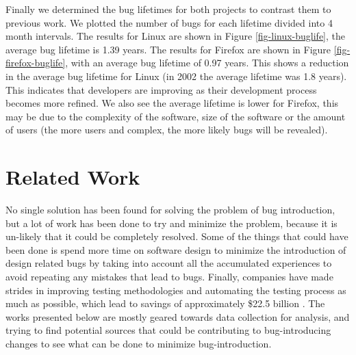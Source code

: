 \documentclass[preprint, 11pt]{sigplanconf}
\begin{document}
Finally we determined the bug lifetimes for both projects to contrast
them to previous work. We plotted the number of bugs for each lifetime
divided into 4 month intervals. The results for Linux are shown in
Figure \ref{fig-linux-buglife}, the average bug lifetime is 1.39
years. The results for Firefox are shown in Figure
\ref{fig-firefox-buglife}, with an average bug lifetime of 0.97
years. This shows a reduction in the average bug lifetime for Linux (in
2002 the average lifetime was 1.8 years). This indicates that
developers are improving as their development process becomes more
refined. We also see the average lifetime is lower for Firefox, this
may be due to the complexity of the software, size of the software or
the amount of users (the more users and complex, the more likely bugs will be
revealed).

\section{Related Work}
\label{sec-related}

No single solution has been found for solving the problem of bug
introduction, but a lot of work has been done to try and minimize the
problem, because it is un-likely that it could be completely
resolved. Some of the things that could have been done is spend more
time on software design to minimize the introduction of design related
bugs by taking into account all the accumulated experiences to avoid
repeating any mistakes that lead to bugs. Finally, companies have made
strides in improving testing methodologies and automating the testing
process as much as possible, which lead to savings of approximately
\$22.5 billion \cite{2004-industry}. The works presented below are
mostly geared towards data collection for analysis, and trying to find
potential sources that could be contributing to bug-introducing
changes to see what can be done to minimize bug-introduction.
\end{document}

